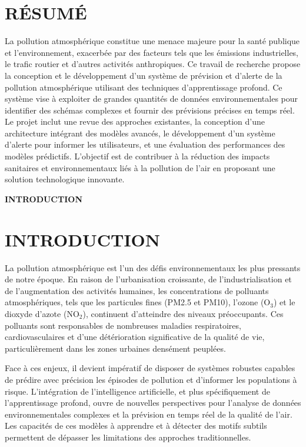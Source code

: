 \documentclass[12pt,a4paper]{report}
\begin{document}
\newpage
{}
{}
\chapter*{RÉSUMÉ}
La pollution atmosphérique constitue une menace majeure pour la santé publique et l’environnement, exacerbée par des facteurs tels que les émissions industrielles, le trafic routier et d’autres activités anthropiques. Ce travail de recherche propose la conception et le développement d’un système de prévision et d’alerte de la pollution atmosphérique utilisant des techniques d’apprentissage profond. Ce système vise à exploiter de grandes quantités de données environnementales pour identifier des schémas complexes et fournir des prévisions précises en temps réel. Le projet inclut une revue des approches existantes, la conception d’une architecture intégrant des modèles avancés, le développement d’un système d’alerte pour informer les utilisateurs, et une évaluation des performances des modèles prédictifs. L’objectif est de contribuer à la réduction des impacts sanitaires et environnementaux liés à la pollution de l’air en proposant une solution technologique innovante.

\newpage
\thispagestyle{empty}
\begin{center}
\vspace*{\fill}
{\Huge\textbf{INTRODUCTION}}
\vspace*{\fill}
\end{center}

\chapter{INTRODUCTION}
La pollution atmosphérique est l’un des défis environnementaux les plus pressants de notre époque. En raison de l’urbanisation croissante, de l’industrialisation et de l’augmentation des activités humaines, les concentrations de polluants atmosphériques, tels que les particules fines (PM2.5 et PM10), l’ozone (O$_3$) et le dioxyde d’azote (NO$_2$), continuent d’atteindre des niveaux préoccupants. Ces polluants sont responsables de nombreuses maladies respiratoires, cardiovasculaires et d’une détérioration significative de la qualité de vie, particulièrement dans les zones urbaines densément peuplées.

Face à ces enjeux, il devient impératif de disposer de systèmes robustes capables de prédire avec précision les épisodes de pollution et d’informer les populations à risque. L’intégration de l’intelligence artificielle, et plus spécifiquement de l’apprentissage profond, ouvre de nouvelles perspectives pour l’analyse de données environnementales complexes et la prévision en temps réel de la qualité de l’air. Les capacités de ces modèles à apprendre et à détecter des motifs subtils permettent de dépasser les limitations des approches traditionnelles.
\end{document}
